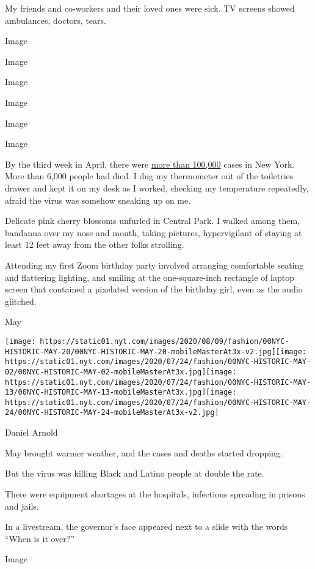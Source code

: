 My friends and co-workers and their loved ones were sick. TV screens
showed ambulances, doctors, tears.

Image

Image

Image

Image

Image

Image

By the third week in April, there were
\href{https://www1.nyc.gov/assets/doh/downloads/pdf/imm/covid-19-daily-data-summary-04142020-1.pdf}{more
than 100,000} cases in New York. More than 6,000 people had died. I dug
my thermometer out of the toiletries drawer and kept it on my desk as I
worked, checking my temperature repeatedly, afraid the virus was somehow
sneaking up on me.

Delicate pink cherry blossoms unfurled in Central Park. I walked among
them, bandanna over my nose and mouth, taking pictures, hypervigilant of
staying at least 12 feet away from the other folks strolling.

Attending my first Zoom birthday party involved arranging comfortable
seating and flattering lighting, and smiling at the one-square-inch
rectangle of laptop screen that contained a pixelated version of the
birthday girl, even as the audio glitched.

May

\texttt{[image: https://static01.nyt.com/images/2020/08/09/fashion/00NYC-HISTORIC-MAY-20/00NYC-HISTORIC-MAY-20-mobileMasterAt3x-v2.jpg]}\texttt{[image: https://static01.nyt.com/images/2020/07/24/fashion/00NYC-HISTORIC-MAY-02/00NYC-HISTORIC-MAY-02-mobileMasterAt3x.jpg]}\texttt{[image: https://static01.nyt.com/images/2020/07/24/fashion/00NYC-HISTORIC-MAY-13/00NYC-HISTORIC-MAY-13-mobileMasterAt3x.jpg]}\texttt{[image: https://static01.nyt.com/images/2020/07/24/fashion/00NYC-HISTORIC-MAY-24/00NYC-HISTORIC-MAY-24-mobileMasterAt3x-v2.jpg]}

Daniel Arnold

May brought warmer weather, and the cases and deaths started dropping.

But the virus was killing Black and Latino people at double the rate.

There were equipment shortages at the hospitals, infections spreading in
prisons and jails.

In a livestream, the governor's face appeared next to a slide with the
words ``When is it over?''

Image

